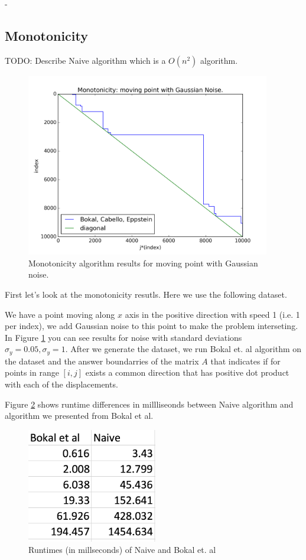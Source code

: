 \documentclass{article}
\begin{document}
- 



\subsection{Monotonicity}

TODO: Describe Naive algorithm which is a $O(n^2)$ algorithm.

\begin{figure}[!ht]
  \centering
  \includegraphics[height=8cm]{../plots/monotonicity_moving_gaussian}
  \caption{Monotonicity algorithm results for moving point with Gaussian noise.}
  \label{fig:monotonicity_demo}
\end{figure}

First let's look at the monotonicity resutls. Here we use the following dataset.

We have a point moving along $x$ axis in the positive direction with speed 1 (i.e. 1 per index), we add Gaussian noise to this point to make the problem interseting. In Figure \ref{fig:monotonicity_demo} you can see results for noise with standard deviations $\sigma_y = 0.05, \sigma_y = 1$. After we generate the dataset, we run Bokal et. al algorithm on the dataset and the answer boundarries of the matrix $A$ that indicates if for points in range $[i, j]$ exists a common direction that has positive dot product with each of the displacements.

Figure \ref{fig:monotonicity_comparison} shows runtime differences in millliseonds between Naive algorithm and algorithm we presented from Bokal et al.
\begin{figure}[!ht]
  \centering
  \includegraphics[height=5cm]{../plots/monotonicity_comparison}
  \caption{Runtimes (in millseconds) of Naive and Bokal et. al}
  \label{fig:monotonicity_comparison}
\end{figure}
\end{document}
